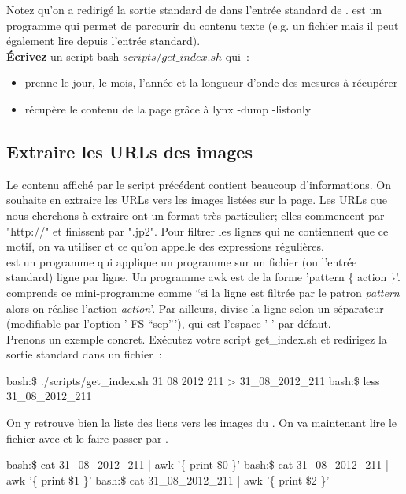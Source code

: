 Notez qu'on a redirigé la sortie standard de \lynx dans l'entrée standard de \less. \less est un programme qui permet de parcourir du contenu texte (e.g. un fichier mais il peut également lire depuis l'entrée standard).\\


\textbf{Écrivez} un script bash $scripts/get\_index.sh$ qui~:
\begin{itemize}
\item prenne le jour, le mois, l'année et la longueur d'onde des mesures à récupérer
\item récupère le contenu de la page grâce à lynx -dump -listonly 
\end{itemize}

\subsection{Extraire les URLs des images}

Le contenu affiché par le script précédent contient beaucoup d'informations. On souhaite en extraire les URLs vers les images listées sur la page. Les URLs que nous cherchons à extraire ont un format très particulier; elles commencent par "http://"  et finissent par ".jp2". Pour filtrer les lignes qui ne contiennent que ce motif, on va utiliser \gawk et ce qu'on appelle des expressions régulières.\\

\awk est un programme qui applique un programme sur un fichier (ou l'entrée standard) ligne par ligne. Un programme awk est de la forme 'pattern \{ action \}'. \awk comprends ce mini-programme comme ``si la ligne est filtrée par le patron \emph{pattern} alors on réalise l'action \emph{action}'. Par ailleurs, \awk divise la ligne selon un séparateur (modifiable par l'option '-FS ``sep'''), qui est l'espace ' ' par défaut.\\

Prenons un exemple concret. Exécutez votre script get\_index.sh et redirigez la sortie standard dans un fichier~:
\begin{exempleResultat}
bash:\$ ./scripts/get\_index.sh 31 08 2012 211 > 31\_08\_2012\_211
bash:\$ less 31\_08\_2012\_211
\end{exempleResultat}
 
On y retrouve bien la liste des liens vers les images du \datesoleil. On va maintenant lire le fichier avec \cat et le faire passer par \awk.
\begin{exempleResultat}
bash:\$ cat 31\_08\_2012\_211 | awk '\{ print \$0 \}'
bash:\$ cat 31\_08\_2012\_211 | awk '\{ print \$1 \}'
bash:\$ cat 31\_08\_2012\_211 | awk '\{ print \$2 \}'
\end{exempleResultat}

